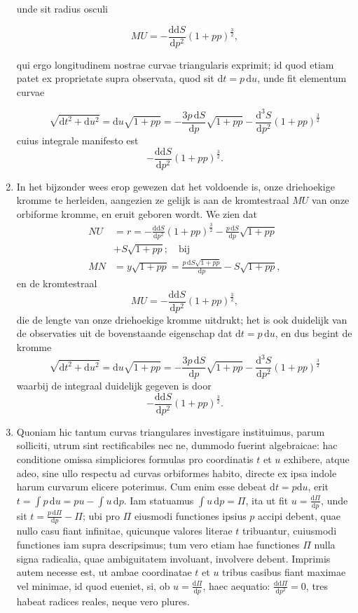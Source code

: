 \documentclass[10pt,a4paper]{article}
\newcommand{\switchenum}{\setcounter{enumi}{\arabic{enumi}-1}\switchcolumn}
\def\D{\mathrm{d}}
\begin{document}
\begin{paracol}{2}
\begin{enumerate}[topsep=1px]
		unde sit radius osculi
		
		\[
			MU = -\frac{\D \D S}{\D p^2}(1+pp)^\frac{3}{2},
		\]
		\par qui ergo longitudinem nostrae curvae triangularis exprimit; id quod etiam patet ex proprietate supra observata, quod sit $\D t = p\, \D u$, unde fit elementum curvae
		
		\[
			\sqrt{\D t^2+\D u^2} = \D u\sqrt{1+pp} = -\frac{3p\, \D S}{\D p}\sqrt{1+pp}-\frac{\D^3S}{\D p^2}(1+pp)^\frac{3}{2}
		\]
		cuius integrale manifesto est
		\[
			-\frac{\D \D S}{\D p^2}(1+pp)^\frac{3}{2}.
		\]
		
		\switchenum
		\item In het bijzonder wees erop gewezen dat het voldoende is, onze driehoekige kromme te herleiden, aangezien ze gelijk is aan de kromtestraal $MU$ van onze orbiforme kromme, en eruit geboren wordt. We zien dat
		\begin{align*}
			NU &= r = -\frac{\D \D S}{\D p^2}(1+pp)^\frac{3}{2}-\frac{p\,\D S}{\D p}\sqrt{1+pp}\\
			& +S\sqrt{1+pp}; \quad \text{bij}\\
			MN & = y\sqrt{1+pp} = \frac{p\, \D S\sqrt{1+pp}}{\D p}-S\sqrt{1+pp},
		\end{align*}
		en de kromtestraal
		\[
			MU = -\frac{\D \D S}{\D p^2}(1+pp)^\frac{3}{2},
		\]
		die de lengte van onze driehoekige kromme uitdrukt; het is ook duidelijk van de observaties uit de bovenstaande eigenschap dat $\D t = p\, \D u$, en dus begint de kromme 
		\[
			\sqrt{\D t^2+\D u^2} = \D u\sqrt{1+pp} = -\frac{3p\, \D S}{\D p}\sqrt{1+pp}-\frac{\D^3S}{\D p^2}(1+pp)^\frac{3}{2}
		\]
		waarbij de integraal duidelijk gegeven is door
		\[
			-\frac{\D \D S}{\D p^2}(1+pp)^\frac{3}{2}.
		\]

		\switchcolumn*
		
		\item Quoniam hic tantum curvas triangulares investigare instituimus, parum solliciti, utrum sint rectificabiles nec ne, dummodo fuerint algebraicae: hac conditione omissa simpliciores formulas pro coordinatis $t$ et $u$ exhibere, atque adeo, sine ullo respectu ad curvas orbiformes habito, directe ex ipsa indole harum curvarum elicere poterimus. Cum enim esse debeat $\D t=p \D u$, erit $t=\int p\,\D u = pu-\int u \,\D p$. Iam statuamus $\int u \,\D p = \Pi$, ita ut fit $u=\frac{\D \Pi}{\D p}$, unde sit $t=\frac{p\,\D \Pi}{\D p}-\Pi$; ubi pro $\Pi$ eiusmodi functiones ipsius $p$ accipi debent, quae nullo casu fiant infinitae, quicunque valores literae $t$ tribuantur, cuiusmodi functiones iam supra descripsimus; tum vero etiam hae functiones $\Pi$ nulla signa radicalia, quae ambiguitatem involuant, involvere debent. Imprimis autem necesse est, ut ambae coordinatae $t$ et $u$ tribus casibus fiant maximae vel minimae, id quod eueniet, si, ob $u=\frac{\D \Pi}{\D p}$, haec aequatio: $\frac{\D\D \Pi}{\D p^2} = 0$, tres habeat radices reales, neque vero plures.


\end{enumerate}
\end{paracol}
\end{document}
